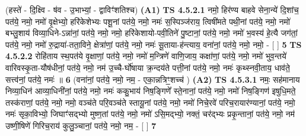\documentclass[17pt]{extarticle}
\begin{document}
                  \newline
                      (हस्ते॑ - दि॒क्ष्वि - ष॑व - उ॒भाभ्यां॒ - द्वाविꣳ॑शतिश्च)  \textbf{(A1)} \newline \newline
                                        \textbf{ TS 4.5.2.1} \newline
                  नमो॒ हिर॑ण्य बाहवे सेना॒न्ये॑ दि॒शांच॒ पत॑ये॒ नमो॒                        नमो॑ वृ॒क्षेभ्यो॒ हरि॑केशेभ्यः पशू॒नां पत॑ये॒ नमो॒                नमः॑ स॒स्पिञ्ज॑राय॒ त्विषी॑मते पथी॒नां पत॑ये॒ नमो॒                    नमो॑ बभ्लु॒शाय॑ विव्या॒धिने-ऽन्ना॑नां॒ पत॑ये॒ नमो॒                  नमो॒ हरि॑केशायो-पवी॒तिने॑ पु॒ष्टानां॒ पत॑ये॒ नमो॒                                 नमो॑ भ॒वस्य॑ हे॒त्यै जग॑तां॒ पत॑ये॒ नमो॒                                                नमो॑ रु॒द्राया॑-तता॒विने॒ क्षेत्रा॑णां॒ पत॑ये॒ नमो॒                          नमः॑ सू॒ताया-ह॑न्त्याय॒ वना॑नां॒ पत॑ये॒ नमो॒ नमो॒ - [  ] \textbf{  5} \newline
                  \newline
                                \textbf{ TS 4.5.2.2} \newline
                  रोहि॑ताय स्थ॒पत॑ये वृ॒क्षाणां॒ पत॑ये॒ नमो॒                                      नमो॑ म॒न्त्रिणे॑ वाणि॒जाय॒ कक्षा॑णां॒ पत॑ये॒ नमो॒                          नमो॑ भुव॒न्तये॑ वारिवस्कृ॒ता-यौष॑धीनां॒ पत॑ये॒ नमो॒   नम॑ उ॒च्चै-र्घो॑षाया क्र॒न्दय॑ते पत्ती॒नां पत॑ये॒ नमो॒                    नमः॑ कृथ्स्नवी॒ताय॒ धाव॑ते॒ सत्त्व॑नां॒ पत॑ये॒ नमः॑ ॥ \textbf{  6} \newline
                  \newline
                      (वना॑नां॒ पत॑ये॒ नमो॒ नम॒ - एका॒न्नत्रिꣳ॒॒शच्च॑ )  \textbf{(A2)} \newline \newline
                                        \textbf{ TS 4.5.3.1} \newline
                  नमः॒ सह॑मानाय निव्या॒धिन॑ आव्या॒धिनी॑नां॒ पत॑ये॒ नमो॒          नमः॑ ककु॒भाय॑ निष॒ङ्गिणे᳚ स्ते॒नानां॒ पत॑ये॒ नमो॒                       नमो॑ निष॒ङ्गिण॑ इषुधि॒मते॒ तस्क॑राणां॒ पत॑ये॒ नमो॒           नमो॒ वञ्च॑ते परि॒वञ्च॑ते स्तायू॒नां पत॑ये॒ नमो॒                                         नमो॑ निचे॒रवे॑ परिच॒रायार॑ण्यानां॒ पत॑ये॒ नमो॒                                   नमः॑ सृका॒विभ्यो॒ जिघाꣳ॑सद्भ्यो मुष्ण॒तां पत॑ये॒ नमो॒                   नमो॑ ऽसि॒मद्भ्यो॒ नक्तं॒ चर॑द्भ्यः प्रकृ॒न्तानां॒ पत॑ये॒ नमो॒ नम॑ उष्णी॒षिणे॑ गिरिच॒राय॑ कुलु॒ञ्चानां॒ पत॑ये॒ नमो॒ नम॒ - [  ] \textbf{  7} \newline
\end{document}
